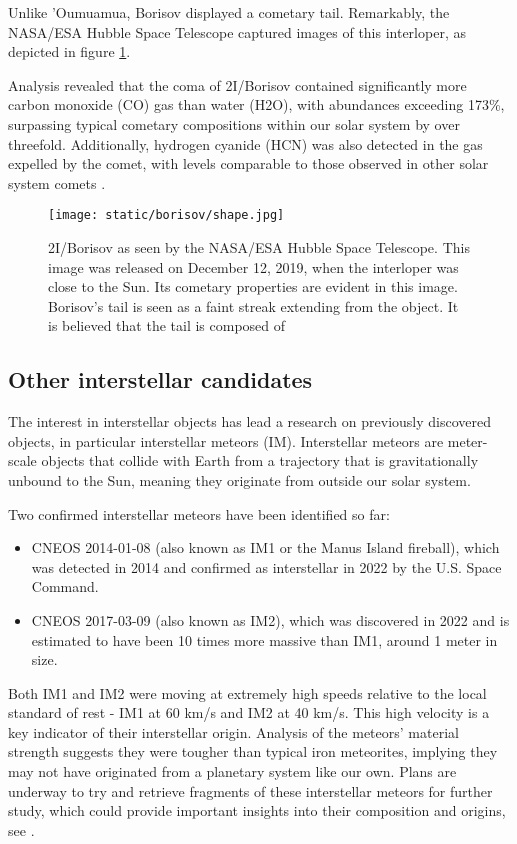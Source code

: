 Unlike 'Oumuamua, Borisov displayed a cometary tail. Remarkably, the NASA/ESA
Hubble Space Telescope captured images of this interloper, as depicted in figure
\ref{fig:borisov_shape}.

Analysis revealed that the coma of 2I/Borisov contained significantly more
carbon monoxide (CO) gas than water (H2O), with abundances exceeding 173\%,
surpassing typical cometary compositions within our solar system by over
threefold. Additionally, hydrogen cyanide (HCN) was also detected in the gas
expelled by the comet, with levels comparable to those observed in other solar
system comets \cite{bodewits2020}.

\begin{figure}[H]
  \centering
  \texttt{[image: static/borisov/shape.jpg]}
\caption[Borisov as seen by the NASA/ESA Hubble Space Telescope]{
  2I/Borisov as seen by the NASA/ESA Hubble Space Telescope. This image was
  released on December 12, 2019, when the interloper was close to the Sun. Its
  cometary properties are evident in this image. Borisov's tail is seen as a
faint streak extending from the object. It is believed that the tail is composed
of 
  }
  \label{fig:borisov_shape}
\end{figure}

\subsection{Other interstellar candidates}

The interest in interstellar objects has lead a research on previously
discovered objects, in particular interstellar meteors (IM). Interstellar
meteors are meter-scale objects that collide with Earth from a trajectory that
is gravitationally unbound to the Sun, meaning they originate from outside our
solar system. 

Two confirmed interstellar meteors have been identified so far:

\begin{itemize}
  \item CNEOS 2014-01-08 (also known as IM1 or the Manus Island fireball), which
    was detected in 2014 and confirmed as interstellar in 2022 by the U.S. Space
    Command.
  \item CNEOS 2017-03-09 (also known as IM2), which was discovered in 2022 and is
    estimated to have been 10 times more massive than IM1, around 1 meter in
    size.
\end{itemize}

Both IM1 and IM2 were moving at extremely high speeds relative to the local
standard of rest - IM1 at 60 km/s and IM2 at 40 km/s. This high velocity is a
key indicator of their interstellar origin. Analysis of the meteors' material
strength suggests they were tougher than typical iron meteorites, implying they
may not have originated from a planetary system like our own. Plans are underway
to try and retrieve fragments of these interstellar meteors for further study,
which could provide important insights into their composition and origins, see
\cite{siraj2022discovery}.
